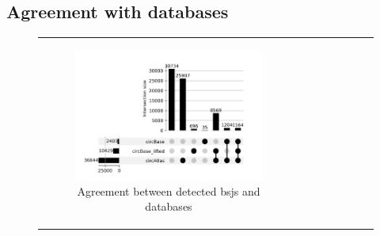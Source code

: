 \subsection{Agreement with databases}
\begin{figure}[ht] \begin{tabular}{cc} \begin{subfigure}{0.5\textwidth}
                                           \centering

                                           \includegraphics[width=\linewidth]{chapters/4_results_and_discussion/figures/detection/database_upset.png}
                                           \caption{Agreement between detected
                                               \glspl{bsj} and databases}
                                           \label{fig:db_upset}
                                       \end{subfigure} &
               \begin{subfigure}{0.5\textwidth} \centering


\end{subfigure}
\end{tabular}
\end{figure}
